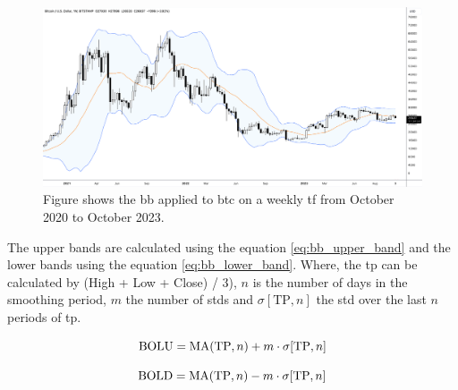 \begin{figure}[ht]
    \centering
    \includegraphics[width=\textwidth]{./assets/img/bitcoin_bollinger_bands.png}
    \caption{Figure shows the \gls{bb} applied to \gls{btc} on a weekly \gls{tf} from October 2020 to October 2023.}
    \label{fig:bollinger_bands}
\end{figure}

\noindent
The upper bands are calculated using the equation \ref{eq:bb_upper_band} and the lower bands using the equation \ref{eq:bb_lower_band}. Where, the \gls{tp} can be calculated by (High + Low + Close) / 3), $n$ is the number of days in the smoothing period, $m$ the number of \glspl{std} and $\sigma [\text{TP}, n]$ the \gls{std} over the last $n$ periods of \gls{tp}.

\begin{equation}
    \centering
    \text{BOLU} = \text{MA}(\text{TP}, n) + m \cdot \sigma [\text{TP}, n]
    \label{eq:bb_upper_band}
\end{equation}

\begin{equation}
    \centering
    \text{BOLD} = \text{MA}(\text{TP}, n) - m \cdot \sigma [\text{TP}, n] 
    \label{eq:bb_lower_band}
\end{equation}

